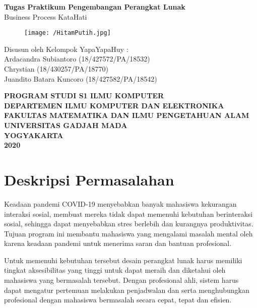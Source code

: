\documentclass{article}
\begin{document}
	\begin{titlepage}
		\begin{center}
			
			\null
			{
				\huge \bfseries Tugas Praktikum Pengembangan Perangkat Lunak}\\
			[1cm]
			{\LARGE Business Process KataHati}\\
			
			\vspace{2cm}
			
			\begin{figure}[H]
				\centering
				\texttt{[image: /HitamPutih.jpg]}
			\end{figure}
			
			\vspace{3cm}
			
			{\Large 
				Disusun oleh Kelompok YapaYapaHuy} {\Large :\\
				\vspace{0.5cm}
				Ardacandra Subiantoro (18/427572/PA/18532)\\
				Chrystian (18/430257/PA/18770)\\
				Juandito Batara Kuncoro (18/427582/PA/18542)\\
			}
			
			
			\vspace{2cm}
			
			{\normalsize \bfseries
				PROGRAM STUDI S1 ILMU KOMPUTER\\
				DEPARTEMEN ILMU KOMPUTER DAN ELEKTRONIKA\\
				FAKULTAS MATEMATIKA DAN ILMU PENGETAHUAN ALAM\\
				UNIVERSITAS GADJAH MADA\\
				YOGYAKARTA\\
				\vspace{0.2cm}
				2020
			}
			
		\end{center}
	\end{titlepage}

	\newpage
	
	\section{Deskripsi Permasalahan}
	\par
	Keadaan pandemi COVID-19 menyebabkan banyak mahasiswa kekurangan interaksi sosial, membuat mereka tidak dapat memenuhi kebutuhan berinteraksi sosial, sehingga dapat menyebabkan stres berlebih dan kurangnya produktivitas. Tujuan program ini membantu mahasiswa yang mengalami masalah mental oleh karena keadaan pandemi untuk menerima saran dan bantuan profesional.
	\par
	Untuk memenuhi kebutuhan tersebut desain perangkat lunak harus memiliki tingkat aksesibilitas yang tinggi untuk dapat meraih dan diketahui oleh mahasiswa yang bermasalah tersebut. Dengan profesional ahli, sistem harus dapat mengatur pertemuan melakukan penjadwalan dan serta menghubungkan profesional dengan mahasiswa bermasalah secara cepat, tepat dan efisien.
	
\end{document}
